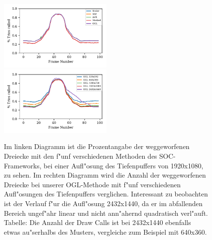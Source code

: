 \documentclass[journal]{vgtc}
\begin{document}
\begin{figure}
	\begin{minipage}{\textwidth}
		\includegraphics[width=0.5\textwidth]{images/Evaluation_1_Results_Percentage culled.pdf}
		\includegraphics[width=0.5\textwidth]{images/Evaluation_4_Results_Percentage culled.pdf}
	\end{minipage}
	\begin{minipage}{\textwidth}
		\centering
	\end{minipage}
	\caption{Im linken Diagramm ist die Prozentangabe der weggeworfenen Dreiecke mit den f"unf verschiedenen Methoden des SOC-Frameworks, bei einer Aufl"osung des Tiefenpuffers von 1920x1080, zu sehen. Im rechten Diagramm wird die Anzahl der weggeworfenen Dreiecke bei unserer OGL-Methode mit f"unf verschiedenen Aufl"osungen des Tiefenpuffers verglichen. Interessant zu beobachten ist der Verlauf f"ur die Aufl"osung 2432x1440, da er im abfallenden Bereich ungef"ahr linear und nicht ann"ahernd quadratisch verl"auft. Tabelle: Die Anzahl der Draw Calls ist bei 2432x1440 ebenfalls etwas au"serhalbs des Musters, vergleiche zum Beispiel mit 640x360.}
	\label{fig:resolution_culled}
\end{figure}
\end{document}
